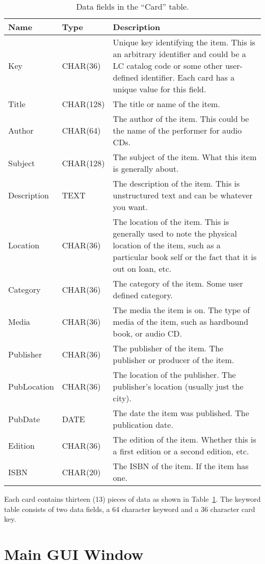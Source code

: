 \begin{table}[h]
\begin{tabular}{|l|l|p{3in}|}
\hline
Name&Type&Description \\
\hline
Key&CHAR(36)&Unique key identifying the item. This is an arbitrary
identifier and could be a LC catalog code or some other user-defined
identifier.  Each card has a unique value for this field.\\
Title&CHAR(128)&The title or name of the item.\\
Author&CHAR(64)&The author of the item. This could be the name of the
performer for audio CDs.\\
Subject&CHAR(128)&The subject of the item.  What this item is generally
about. \\
Description&TEXT&The description of the item.  This is unstructured text
and can be whatever you want.\\
Location&CHAR(36)&The location of the item. This is generally used to
note the physical location of the item, such as a particular book self
or the fact that it is out on loan, etc.\\
Category&CHAR(36)&The category of the item. Some user defined category.\\
Media&CHAR(36)&The media the item is on. The type of media of the item,
such as hardbound book, or audio CD.\\
Publisher&CHAR(36)&The publisher of the item. The publisher or producer
of the item.\\
PubLocation&CHAR(36)&The location of the publisher. The publisher's
location (usually just the city).\\
PubDate&DATE&The date the item was published. The publication date.\\
Edition&CHAR(36)&The edition of the item. Whether this is a first
edition or a second edition, etc.\\
ISBN&CHAR(20)&The ISBN of the item. If the item has one.\\
\hline
\end{tabular}
\caption{Data fields in the ``Card'' table.}
\label{tab:ref:cardfields}
\end{table}
Each card contains thirteen (13) pieces of data as shown in
Table~\ref{tab:ref:cardfields}. The keyword table consists of two data
fields, a 64 character keyword and a 36 character card key.

\section{Main GUI Window}




